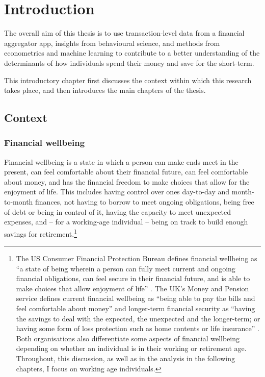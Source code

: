
\chapter{Introduction}%
\label{cha:introduction}

The overall aim of this thesis is to use transaction-level data from a
financial aggregator app, insights from behavioural science, and methods from
econometrics and machine learning to contribute to a better understanding of
the determinants of how individuals spend their money and save for the
short-term.

This introductory chapter first discusses the context within which this
research takes place, and then introduces the main chapters of the thesis.


\section{Context}%
\label{sec:context}

\subsection{Financial wellbeing}%
\label{sub:financial_wellbeing_and_why_it_matters}

Financial wellbeing is a state in which a person can make ends meet in the
present, can feel comfortable about their financial future, can feel
comfortable about money, and has the financial freedom to make choices that
allow for the enjoyment of life. This includes having control over ones
day-to-day and month-to-month finances, not having to borrow to meet
ongoing obligations, being free of debt or being in control of it, having the
capacity to meet unexpected expenses, and -- for a working-age individual --
being on track to build enough savings for retirement.\footnote{The US Consumer
    Financial Protection Bureau defines financial wellbeing as ``a state of
    being wherein a person can fully meet current and ongoing financial
    obligations, can feel secure in their financial future, and is able to make
    choices that allow enjoyment of life'' \citep{cfpb2015financial}. The UK's
    Money and Pension service defines current financial wellbeing as ``being
    able to pay the bills and feel comfortable about money'' and longer-term
    financial security as ``having the savings to deal with the expected, the
    unexpected and the longer-term; or having some form of loss protection such
    as home contents or life insurance'' \citep{mps2018building}. Both
    organisations also differentiate some aspects of financial wellbeing
    depending on whether an individual is in their working or retirement age.
Throughout, this discussion, as well as in the analysis in the following
chapters, I focus on working age individuals.}


